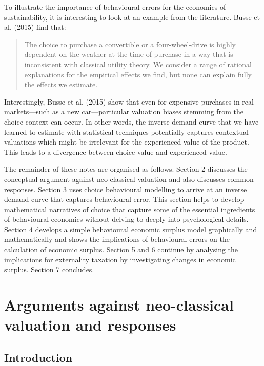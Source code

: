 \documentclass[
]{book}
\begin{document}
To illustrate the importance of behavioural errors for the economics of sustainability, it is interesting to look at an example from the literature. Busse et al. (2015) find that:

\begin{quote}
The choice to purchase a convertible or a four-wheel-drive is highly dependent on the weather at the time of purchase in a way that is inconsistent with classical utility theory. We consider a range of rational explanations for the empirical effects we find, but none can explain fully the effects we estimate.
\end{quote}

Interestingly, Busse et al. (2015) show that even for expensive purchases in real markets---such as a new car---particular valuation biases stemming from the choice context can occur. In other words, the inverse demand curve that we have learned to estimate with statistical techniques potentially captures contextual valuations which might be irrelevant for the experienced value of the product. This leads to a divergence between choice value and experienced value.

The remainder of these notes are organised as follows. Section 2 discusses the conceptual argument against neo-classical valuation and also discusses common responses. Section 3 uses choice behavioural modelling to arrive at an inverse demand curve that captures behavioural error. This section helps to develop mathematical narratives of choice that capture some of the essential ingredients of behavioural economics without delving to deeply into psychological details. Section 4 develops a simple behavioural economic surplus model graphically and mathematically and shows the implications of behavioural errors on the calculation of economic surplus. Section 5 and 6 continue by analysing the implications for externality taxation by investigating changes in economic surplus. Section 7 concludes.

\hypertarget{arguments}{%
\section{Arguments against neo-classical valuation and responses}\label{arguments}}

\hypertarget{introduction-5}{%
\subsection{Introduction}\label{introduction-5}}
\end{document}
